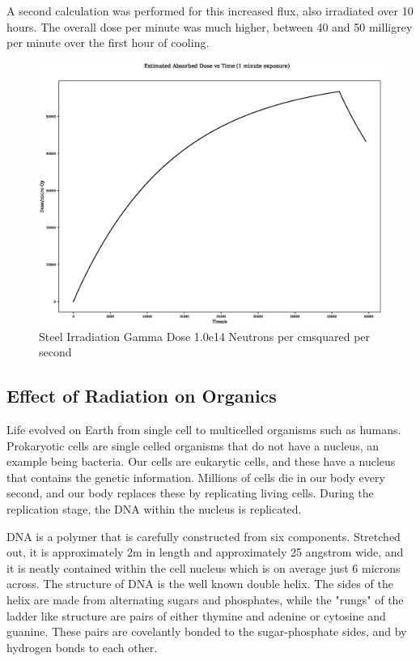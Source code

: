 A second calculation was performed for this increased flux, also irradiated over 10 hours.  The overall dose per minute was much higher, between 40 and 50 milligrey per minute over the first hour of cooling.  

\begin{figure}
  \begin{center}
    \includegraphics[width=15.0cm]{chapters/background_radiation_effects_and_transport/neutron_plots/2/gamma_dose.eps}
    \caption{Steel Irradiation Gamma Dose 1.0e14 Neutrons per cmsquared per second}
    \label{fig:ga_vs_sim_512_2}
  \end{center}
\end{figure}



\subsection{Effect of Radiation on Organics}

Life evolved on Earth from single cell to multicelled organisms such as humans.  Prokaryotic cells are single celled organisms that do not have a nucleus, an example being bacteria.  Our cells are eukarytic cells, and these have a nucleus that contains the genetic information.  Millions of cells die in our body every second, and our body replaces these by replicating living cells.  During the replication stage, the DNA within the nucleus is replicated.    

DNA is a polymer that is carefully constructed from six components.  Stretched out, it is approximately 2m in length and approximately 25 angstrom wide, and it is neatly contained within the cell nucleus which is on average just 6 microns across.  The structure of DNA is the well known double helix.  The sides of the helix are made from alternating sugars and phosphates, while the "rungs" of the ladder like structure are pairs of either thymine and adenine or cytosine and guanine.  These pairs are covelantly bonded to the sugar-phosphate sides, and by hydrogen bonds to each other.


